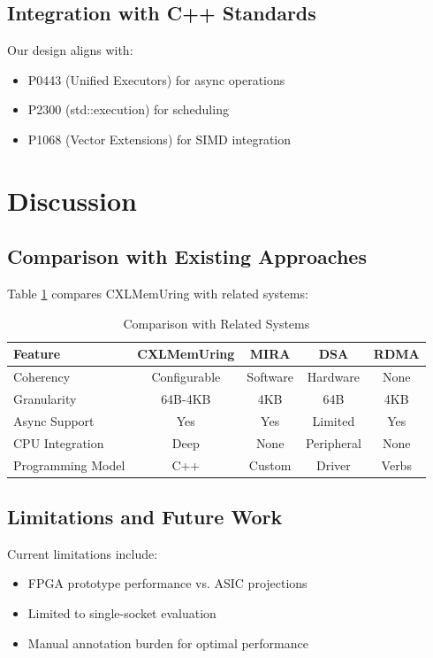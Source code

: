\documentclass[10pt,conference]{IEEEtran}
\begin{document}
\subsection{Integration with C++ Standards}

Our design aligns with:
\begin{itemize}
    \item P0443 (Unified Executors) for async operations
    \item P2300 (std::execution) for scheduling
    \item P1068 (Vector Extensions) for SIMD integration
\end{itemize}

\section{Discussion}

\subsection{Comparison with Existing Approaches}

Table \ref{tab:comparison} compares CXLMemUring with related systems:

\begin{table}[htbp]
\caption{Comparison with Related Systems}
\label{tab:comparison}
\centering
\begin{tabular}{lcccc}
\toprule
\textbf{Feature} & \textbf{CXLMemUring} & \textbf{MIRA} & \textbf{DSA} & \textbf{RDMA} \\
\midrule
Coherency & Configurable & Software & Hardware & None \\
Granularity & 64B-4KB & 4KB & 64B & 4KB \\
Async Support & Yes & Yes & Limited & Yes \\
CPU Integration & Deep & None & Peripheral & None \\
Programming Model & C++ & Custom & Driver & Verbs \\
\bottomrule
\end{tabular}
\end{table}

\subsection{Limitations and Future Work}

Current limitations include:
\begin{itemize}
    \item FPGA prototype performance vs. ASIC projections
    \item Limited to single-socket evaluation
    \item Manual annotation burden for optimal performance
\end{itemize}
\end{document}

